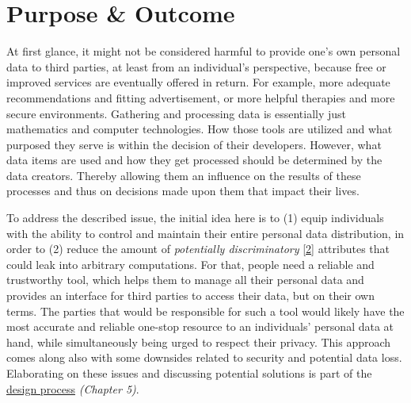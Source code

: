 \documentclass[12pt,english,a4paper,titlepage,cleardoublepage=empty,dottedtoc]{report}
\begin{document}
\section{Purpose \& Outcome}\label{purpose-outcome}

At first glance, it might not be considered harmful to provide one's own
personal data to third parties, at least from an individual's
perspective, because free or improved services are eventually offered in
return. For example, more adequate recommendations and fitting
advertisement, or more helpful therapies and more secure environments.
Gathering and processing data is essentially just mathematics and
computer technologies. How those tools are utilized and what purposed
they serve is within the decision of their developers. However, what
data items are used and how they get processed should be determined by
the data creators. Thereby allowing them an influence on the results of
these processes and thus on decisions made upon them that impact their
lives.

To address the described issue, the initial idea here is to (1) equip
individuals with the ability to control and maintain their entire
personal data distribution, in order to (2) reduce the amount of
\emph{potentially discriminatory}
{[}\protect\hyperlink{ref-paper_2008_discrimination-aware-data-mining}{2}{]}
attributes that could leak into arbitrary computations. For that, people
need a reliable and trustworthy tool, which helps them to manage all
their personal data and provides an interface for third parties to
access their data, but on their own terms. The parties that would be
responsible for such a tool would likely have the most accurate and
reliable one-stop resource to an individuals' personal data at hand,
while simultaneously being urged to respect their privacy. This approach
comes along also with some downsides related to security and potential
data loss. Elaborating on these issues and discussing potential
solutions is part of the \protect\hyperlink{design-discussion}{design
process} \emph{(Chapter 5)}.
\end{document}
